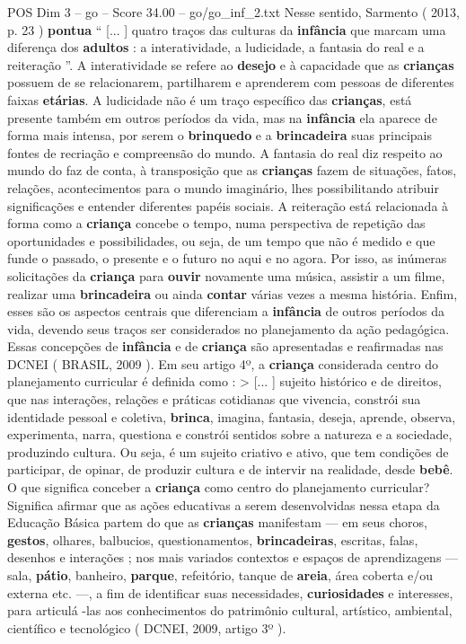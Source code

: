 \begin{textsample}{POS Dim 3 – go – Score 34.00 – go/go\_inf\_2.txt}
Nesse sentido, Sarmento ( 2013, p. 23 ) \textbf{pontua} “ [... ] quatro traços das culturas da \textbf{infância} que marcam uma diferença dos \textbf{adultos} : a interatividade, a ludicidade, a fantasia do real e a reiteração ”.
A interatividade se refere ao \textbf{desejo} e à capacidade que as \textbf{crianças} possuem de se relacionarem, partilharem e aprenderem com pessoas de diferentes faixas \textbf{etárias}.
A ludicidade não é um traço específico das \textbf{crianças}, está presente também em outros períodos da vida, mas na \textbf{infância} ela aparece de forma mais intensa, por serem o \textbf{brinquedo} e a \textbf{brincadeira} suas principais fontes de recriação e compreensão do mundo.
A fantasia do real diz respeito ao mundo do faz de conta, à transposição que as \textbf{crianças} fazem de situações, fatos, relações, acontecimentos para o mundo imaginário, lhes possibilitando atribuir significações e entender diferentes papéis sociais.
A reiteração está relacionada à forma como a \textbf{criança} concebe o tempo, numa perspectiva de repetição das oportunidades e possibilidades, ou seja, de um tempo que não é medido e que funde o passado, o presente e o futuro no aqui e no agora.
Por isso, as inúmeras solicitações da \textbf{criança} para \textbf{ouvir} novamente uma música, assistir a um filme, realizar uma \textbf{brincadeira} ou ainda \textbf{contar} várias vezes a mesma história.
Enfim, esses são os aspectos centrais que diferenciam a \textbf{infância} de outros períodos da vida, devendo seus traços ser considerados no planejamento da ação pedagógica.
Essas concepções de \textbf{infância} e de \textbf{criança} são apresentadas e reafirmadas nas DCNEI ( BRASIL, 2009 ).
Em seu artigo 4º, a \textbf{criança} considerada centro do planejamento curricular é definida como : > [... ] sujeito histórico e de direitos, que nas interações, relações e práticas cotidianas que vivencia, constrói sua identidade pessoal e coletiva, \textbf{brinca}, imagina, fantasia, deseja, aprende, observa, experimenta, narra, questiona e constrói sentidos sobre a natureza e a sociedade, produzindo cultura.
Ou seja, é um sujeito criativo e ativo, que tem condições de participar, de opinar, de produzir cultura e de intervir na realidade, desde \textbf{bebê}.
O que significa conceber a \textbf{criança} como centro do planejamento curricular?
Significa afirmar que as ações educativas a serem desenvolvidas nessa etapa da Educação Básica partem do que as \textbf{crianças} manifestam — em seus choros, \textbf{gestos}, olhares, balbucios, questionamentos, \textbf{brincadeiras}, escritas, falas, desenhos e interações ; nos mais variados contextos e espaços de aprendizagens — sala, \textbf{pátio}, banheiro, \textbf{parque}, refeitório, tanque de \textbf{areia}, área coberta e/ou externa etc. —, a fim de identificar suas necessidades, \textbf{curiosidades} e interesses, para articulá -las aos conhecimentos do patrimônio cultural, artístico, ambiental, científico e tecnológico ( DCNEI, 2009, artigo 3º ).

\end{textsample}
